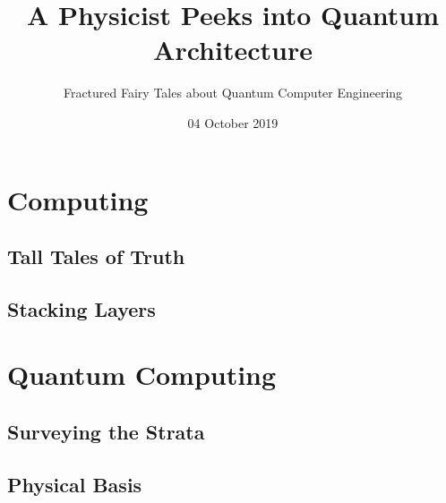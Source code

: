 \documentclass{beamer}
\title{A Physicist Peeks into Quantum Architecture}
\subtitle{Fractured Fairy Tales about Quantum Computer Engineering}
\date{04 October 2019}
\begin{document}
\maketitle

\begin{frame}
\tableofcontents
\end{frame}



\section{Computing}
\subsection{Tall Tales of Truth}




\subsection{Stacking Layers}







\section{Quantum Computing}







\subsection{Surveying the Strata}





\subsection{Physical Basis}






\end{document}
